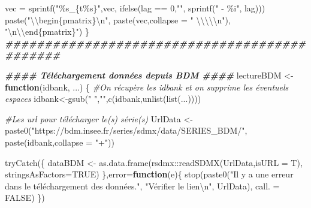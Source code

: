 \documentclass[
  11pt,
]{article}
\newenvironment{Shaded}{\begin{snugshade}}{\end{snugshade}}
\newcommand{\AttributeTok}[1]{\textcolor[rgb]{0.77,0.63,0.00}{#1}}
\newcommand{\CommentTok}[1]{\textcolor[rgb]{0.56,0.35,0.01}{\textit{#1}}}
\newcommand{\ConstantTok}[1]{\textcolor[rgb]{0.00,0.00,0.00}{#1}}
\newcommand{\ControlFlowTok}[1]{\textcolor[rgb]{0.13,0.29,0.53}{\textbf{#1}}}
\newcommand{\DecValTok}[1]{\textcolor[rgb]{0.00,0.00,0.81}{#1}}
\newcommand{\DocumentationTok}[1]{\textcolor[rgb]{0.56,0.35,0.01}{\textbf{\textit{#1}}}}
\newcommand{\FunctionTok}[1]{\textcolor[rgb]{0.00,0.00,0.00}{#1}}
\newcommand{\NormalTok}[1]{#1}
\newcommand{\OtherTok}[1]{\textcolor[rgb]{0.56,0.35,0.01}{#1}}
\newcommand{\SpecialCharTok}[1]{\textcolor[rgb]{0.00,0.00,0.00}{#1}}
\newcommand{\StringTok}[1]{\textcolor[rgb]{0.31,0.60,0.02}{#1}}
\begin{document}
\begin{Shaded}
\begin{Highlighting}[]
\NormalTok{    vec }\OtherTok{=} \FunctionTok{sprintf}\NormalTok{(}\StringTok{"\%s\_\{t\%s\}"}\NormalTok{,vec,}
                  \FunctionTok{ifelse}\NormalTok{(lag }\SpecialCharTok{==} \DecValTok{0}\NormalTok{,}\StringTok{""}\NormalTok{,}
                         \FunctionTok{sprintf}\NormalTok{(}\StringTok{" {-} \%i"}\NormalTok{, lag)))}
    \FunctionTok{paste}\NormalTok{(}\StringTok{"}\SpecialCharTok{\textbackslash{}\textbackslash{}}\StringTok{begin\{pmatrix\}}\SpecialCharTok{\textbackslash{}n}\StringTok{"}\NormalTok{,}
          \FunctionTok{paste}\NormalTok{(vec,}\AttributeTok{collapse =} \StringTok{" }\SpecialCharTok{\textbackslash{}\textbackslash{}\textbackslash{}\textbackslash{}\textbackslash{}n}\StringTok{"}\NormalTok{),}
          \StringTok{"}\SpecialCharTok{\textbackslash{}n\textbackslash{}\textbackslash{}}\StringTok{end\{pmatrix\}"}\NormalTok{)}
\NormalTok{\}}
\DocumentationTok{\#\#\#\#\#\#\#\#\#\#\#\#\#\#\#\#\#\#\#\#\#\#\#\#\#\#\#\#\#\#\#\#\#\#\#\#\#\#\#\#\#\#\#\#\#}

\DocumentationTok{\#\#\#\# Téléchargement données depuis BDM \#\#\#\#}
\NormalTok{lectureBDM }\OtherTok{\textless{}{-}} \ControlFlowTok{function}\NormalTok{(idbank, ...)}
\NormalTok{\{}
    \CommentTok{\#On récupère les idbank et on supprime les éventuels espaces}
\NormalTok{    idbank}\OtherTok{\textless{}{-}}\FunctionTok{gsub}\NormalTok{(}\StringTok{" "}\NormalTok{,}\StringTok{""}\NormalTok{,}\FunctionTok{c}\NormalTok{(idbank,}\FunctionTok{unlist}\NormalTok{(}\FunctionTok{list}\NormalTok{(...))))}
    
    \CommentTok{\#Les url pour télécharger le(s) série(s)}
\NormalTok{    UrlData }\OtherTok{\textless{}{-}} \FunctionTok{paste0}\NormalTok{(}\StringTok{"https://bdm.insee.fr/series/sdmx/data/SERIES\_BDM/"}\NormalTok{,}
                      \FunctionTok{paste}\NormalTok{(idbank,}\AttributeTok{collapse =} \StringTok{"+"}\NormalTok{))}
    
    \FunctionTok{tryCatch}\NormalTok{(\{}
\NormalTok{        dataBDM }\OtherTok{\textless{}{-}} \FunctionTok{as.data.frame}\NormalTok{(rsdmx}\SpecialCharTok{::}\FunctionTok{readSDMX}\NormalTok{(UrlData,}\AttributeTok{isURL =}\NormalTok{ T),}
                                 \AttributeTok{stringsAsFactors=}\ConstantTok{TRUE}\NormalTok{)}
\NormalTok{    \},}\AttributeTok{error=}\ControlFlowTok{function}\NormalTok{(e)\{}
        \FunctionTok{stop}\NormalTok{(}\FunctionTok{paste0}\NormalTok{(}\StringTok{"Il y a une erreur dans le téléchargement des données."}\NormalTok{,}
                    \StringTok{"Vérifier le lien}\SpecialCharTok{\textbackslash{}n}\StringTok{"}\NormalTok{,}
\NormalTok{                    UrlData),}
             \AttributeTok{call. =} \ConstantTok{FALSE}\NormalTok{)}
\NormalTok{    \})}
    

\end{Highlighting}
\end{Shaded}
\end{document}
